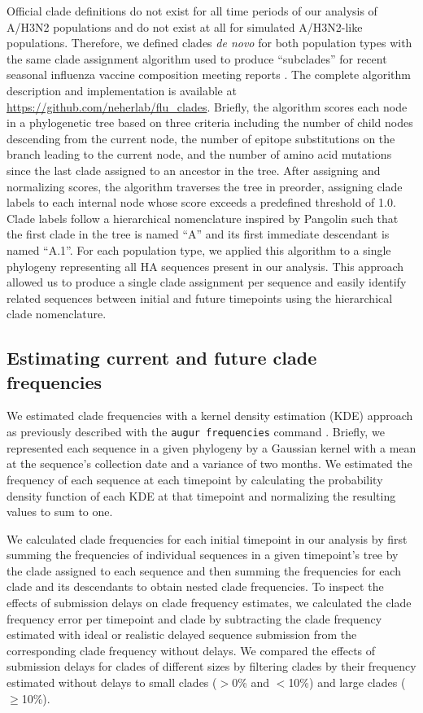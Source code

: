 \documentclass[9pt,lineno]{elife}
\begin{document}
Official clade definitions do not exist for all time periods of our analysis of A/H3N2 populations and do not exist at all for simulated A/H3N2-like populations.
Therefore, we defined clades \emph{de novo} for both population types with the same clade assignment algorithm used to produce ``subclades'' for recent seasonal influenza vaccine composition meeting reports \citep{Huddleston2024}.
The complete algorithm description and implementation is available at \url{https://github.com/neherlab/flu_clades}.
Briefly, the algorithm scores each node in a phylogenetic tree based on three criteria including the number of child nodes descending from the current node, the number of epitope substitutions on the branch leading to the current node, and the number of amino acid mutations since the last clade assigned to an ancestor in the tree.
After assigning and normalizing scores, the algorithm traverses the tree in preorder, assigning clade labels to each internal node whose score exceeds a predefined threshold of 1.0.
Clade labels follow a hierarchical nomenclature inspired by Pangolin \citep{OToole2021} such that the first clade in the tree is named ``A'' and its first immediate descendant is named ``A.1''.
For each population type, we applied this algorithm to a single phylogeny representing all HA sequences present in our analysis.
This approach allowed us to produce a single clade assignment per sequence and easily identify related sequences between initial and future timepoints using the hierarchical clade nomenclature.

\subsection{Estimating current and future clade frequencies}

We estimated clade frequencies with a kernel density estimation (KDE) approach as previously described \citep{Huddleston2020} with the \texttt{augur frequencies} command \citep{Huddleston2021}.
Briefly, we represented each sequence in a given phylogeny by a Gaussian kernel with a mean at the sequence's collection date and a variance of two months.
We estimated the frequency of each sequence at each timepoint by calculating the probability density function of each KDE at that timepoint and normalizing the resulting values to sum to one.

We calculated clade frequencies for each initial timepoint in our analysis by first summing the frequencies of individual sequences in a given timepoint's tree by the clade assigned to each sequence and then summing the frequencies for each clade and its descendants to obtain nested clade frequencies.
To inspect the effects of submission delays on clade frequency estimates, we calculated the clade frequency error per timepoint and clade by subtracting the clade frequency estimated with ideal or realistic delayed sequence submission from the corresponding clade frequency without delays.
We compared the effects of submission delays for clades of different sizes by filtering clades by their frequency estimated without delays to small clades ($>$0\% and $<$10\%) and large clades ($\ge$10\%).
\end{document}
